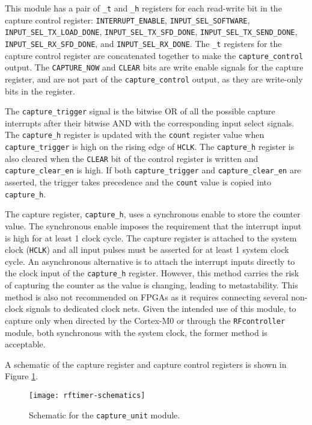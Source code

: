 This module has a pair of \texttt{\_t} and \texttt{\_h} registers for each read-write bit in the capture control register: \texttt{INTERRUPT\_ENABLE}, \texttt{INPUT\_SEL\_SOFTWARE}, \texttt{INPUT\_SEL\_TX\-\_LOAD\_DONE}, \texttt{INPUT\_SEL\_TX\_SFD\_DONE}, \texttt{INPUT\_SEL\_TX\_SEND\_DONE},
\texttt{INPUT\_SEL\_RX\-\_SFD\_DONE}, and \texttt{INPUT\_SEL\_RX\_DONE}. The \texttt{\_t} registers for the capture control register are concatenated together to make the \texttt{capture\_control} output. The \texttt{CAPTURE\-\_NOW} and \texttt{CLEAR} bits are write enable signals for the capture register, and are not part of the \texttt{capture\_control} output, as they are write-only bits in the register.

The \texttt{capture\_trigger} signal is the bitwise OR of all the possible capture interrupts after their bitwise AND with the corresponding input select signals. The \texttt{capture\_h} register is updated with the \texttt{count} register value when \texttt{capture\_trigger} is high on the rising edge of \texttt{HCLK}. The \texttt{capture\_h} register is also cleared when the \texttt{CLEAR} bit of the control register is written and \texttt{capture\_clear\_en} is high. If both \texttt{capture\_trigger} and \texttt{capture\_clear\_en} are asserted, the trigger takes precedence and the \texttt{count} value is copied into \texttt{capture\_h}.

The capture register, \texttt{capture\_h}, uses a synchronous enable to store the counter value. The synchronous enable imposes the requirement that the interrupt input is high for at least 1 clock cycle. The capture register is attached to the system clock (\texttt{HCLK}) and all input pulses must be asserted for at least 1 system clock cycle. An asynchronous alternative is to attach the interrupt inputs directly to the clock input of the \texttt{capture\_h} register. However, this method carries the risk of capturing the counter as the value is changing, leading to metastability. This method is also not recommended on FPGAs as it requires connecting several non-clock signals to dedicated clock nets. Given the intended use of this module, to capture only when directed by the Cortex-M0 or through the \texttt{RFcontroller} module, both synchronous with the system clock, the former method is acceptable.

A schematic of the capture register and capture control registers is shown in Figure \ref{fig:capture-unit}.

\begin{figure}
	\centering
	\texttt{[image: rftimer-schematics]}
	\caption{Schematic for the \texttt{capture\_unit} module.}
	\label{fig:capture-unit}
\end{figure}

